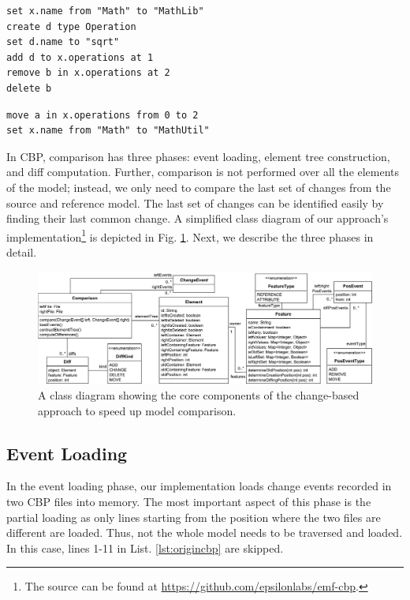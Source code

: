 \documentclass{jot}
\begin{document}
    
\begin{minipage}[t]{0.49\linewidth}    
\begin{lstlisting}[firstnumber=12,style=eol,caption={The appended changes made by Bob to produce the model in Fig. \ref{fig:left} (left version).},label=lst:leftcbp]
set x.name from "Math" to "MathLib"
create d type Operation
set d.name to "sqrt"
add d to x.operations at 1
remove b in x.operations at 2
delete b
\end{lstlisting}
\end{minipage}
\hfill
\begin{minipage}[t]{0.49\linewidth}
\begin{lstlisting}[firstnumber=12,style=eol,caption={The appended changes made by Alice to produce the model in Fig. \ref{fig:right} (right version).},label=lst:rightcbp]
move a in x.operations from 0 to 2
set x.name from "Math" to "MathUtil"
\end{lstlisting}
\end{minipage}
    
    In CBP, comparison has three phases: event loading, element tree construction, and diff computation.
    Further, comparison is not performed over all the elements of the model; instead, we only need to compare the last set of changes from the source and reference model.
    The last set of changes can be identified easily by finding their last common change.
    A simplified class diagram of our approach's implementation\footnote{The source can be found at \url{https://github.com/epsilonlabs/emf-cbp}.} is depicted in Fig. \ref{fig:approach_class_diagram}. 
    Next, we describe the three phases in detail.
    
    \begin{figure}
        \includegraphics[width=\linewidth]{TreeClassDiagram}
        \caption{A class diagram showing the core components of the change-based approach to speed up model comparison.}
        \label{fig:approach_class_diagram}
    \end{figure}
    
    \subsection{Event Loading}
    \label{sec:event_loading}
    In the event loading phase, our implementation loads change events recorded in two CBP files into memory.
    The most important aspect of this phase is the partial loading as only lines starting from the position where the two files are different are loaded.
    Thus, not the whole model needs to be traversed and loaded.
    In this case, lines 1-11 in List. \ref{lst:origincbp} are skipped.
    
\end{document}

